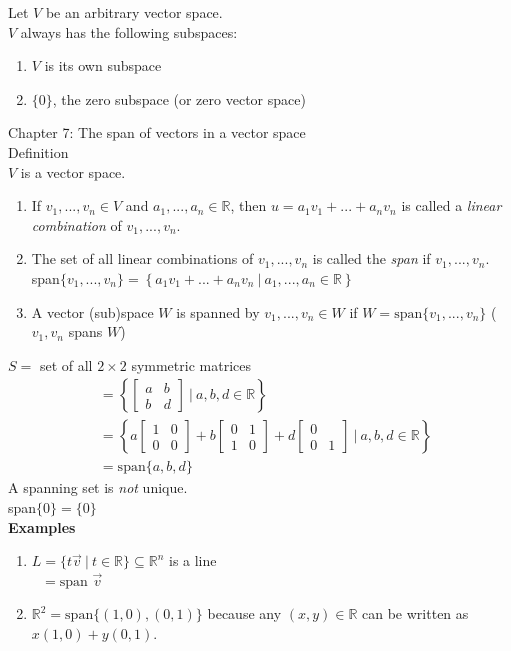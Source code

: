 \documentclass[]{article}
\begin{document}
		Let $V$ be an arbitrary vector space.\\
		$V$ always has the following subspaces:
		\begin{enumerate}
			\item $V$ is its own subspace
			\item $\{0\}$, the zero subspace (or zero vector space)
		\end{enumerate}
		\pagebreak
		\Large{Chapter 7: The span of vectors in a vector space}\\
		\large{Definition}\\
		\normalsize $V$ is a vector space.
		\begin{enumerate}
			\item If $v_1,...,v_n\in V$ and $a_1,...,a_n\in\mathbb{R}$, then $u=a_1v_1+...+a_nv_n$ is called a \emph{linear combination} of $v_1,...,v_n$.
			\item The set of all linear combinations of $v_1,...,v_n$ is called the \emph{span} if $v_1,...,v_n$.\\
			span$\{v_1,...,v_n\}=\left\{a_1v_1+...+a_nv_n~|~a_1,...,a_n\in\mathbb{R}\right\}$
			\item A vector (sub)space $W$ is spanned by $v_1,...,v_n\in W$ if $W=\text{span}\{v_1,...,v_n\}$ ($v_1,v_n$ spans $W$)
		\end{enumerate}
		$S=$ set of all $2\times 2$ symmetric matrices
		\begin{align*}
			&=\left\{\begin{bmatrix}{a}&{b}\\{b}&{d}\end{bmatrix}~|~a,b,d\in\mathbb{R}\right\}\\
			&=\left\{ a\begin{bmatrix}{1}&{0}\\{0}&{0}\end{bmatrix}+b\begin{bmatrix}{0}&{1}\\{1}&{0}\end{bmatrix}+d\begin{bmatrix}{0}&{}\\{0}&{1}\end{bmatrix}~|~a,b,d\in\mathbb{R} \right\}\\
			&=\text{span}\{a,b,d\}
		\end{align*}
		A spanning set is \emph{not} unique.\\
		span$\{0\}=\{0\}$\\
		{\bf Examples}
		\begin{enumerate}
			\item $L=\{ t\vec{v}~|~t\in\mathbb{R} \}\subseteq\mathbb{R}^n$ is a line\\
			$~~~=\text{span }\vec{v}$
			\item $\mathbb{R}^2=\text{span}\{(1,0),(0,1)\}$ because any $(x,y)\in\mathbb{R}$ can be written as $x(1,0)+y(0,1)$.
		\end{enumerate}
\end{document}
